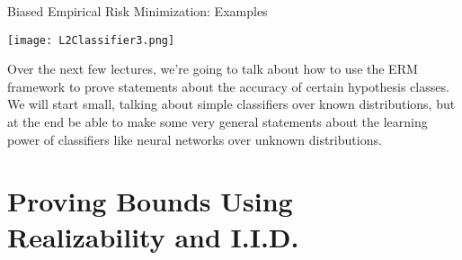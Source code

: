 \documentclass[10pt, table, handout]{beamer}
\begin{document}
\begin{frame}[fragile]{Biased Empirical Risk Minimization: Examples}
  \begin{minipage}[t][0.5\textheight][t]{\textwidth}
    \texttt{[image: L2Classifier3.png]}
        \centering
  \end{minipage}
  \vfill
  \begin{minipage}[t][0.5\textheight][t]{\textwidth}
Over the next few lectures, we're going to talk about how to use the ERM framework to prove statements about the accuracy of certain hypothesis classes. We will start small, talking about simple classifiers over known distributions, but at the end be able to make some very general statements about the learning power of classifiers like neural networks over unknown distributions. 
  \end{minipage}
\end{frame}


\section{Proving Bounds Using Realizability and I.I.D.}
\end{document}
